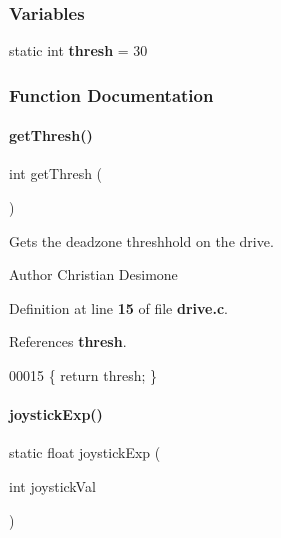 \subsubsection*{Variables}
\begin{DoxyCompactItemize}
\item 
static int \textbf{ thresh} = 30
\end{DoxyCompactItemize}


\subsubsection{Function Documentation}
\mbox{\label{a00092_a9caa5e772598f9182c9ec84cf8c351ee}} 
\paragraph{get\+Thresh()}
{\footnotesize\ttfamily int get\+Thresh (\begin{DoxyParamCaption}{ }\end{DoxyParamCaption})}



Gets the deadzone threshhold on the drive. 

\begin{DoxyAuthor}{Author}
Christian Desimone 
\end{DoxyAuthor}


Definition at line \textbf{ 15} of file \textbf{ drive.\+c}.



References \textbf{ thresh}.


\begin{DoxyCode}
00015 \{ \textcolor{keywordflow}{return} thresh; \}
\end{DoxyCode}
\mbox{\label{a00092_a6de4fbb9197f2f350c53a9f8bf23a8f1}} 
\paragraph{joystick\+Exp()}
{\footnotesize\ttfamily static float joystick\+Exp (\begin{DoxyParamCaption}\item[{int}]{joystick\+Val }\end{DoxyParamCaption})\hspace{0.3cm}{\ttfamily [static]}}



